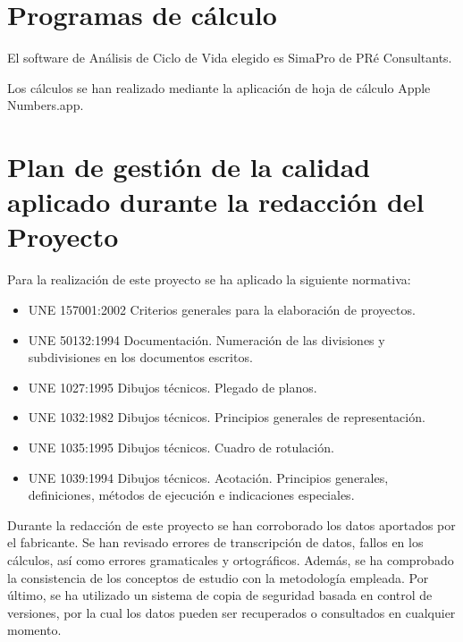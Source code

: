 \section{Programas de cálculo}

El software de Análisis de Ciclo de Vida elegido es SimaPro de PRé Consultants.

Los cálculos se han realizado mediante la aplicación de hoja de cálculo Apple Numbers.app.

\section{Plan de gestión de la calidad aplicado durante la redacción del Proyecto}

Para la realización de este proyecto se ha aplicado la siguiente normativa:
\begin{itemize}
  \item UNE 157001:2002 Criterios generales para la elaboración de proyectos.
  \item UNE 50132:1994 Documentación. Numeración de las divisiones y subdivisiones en los documentos escritos.
  \item UNE 1027:1995 Dibujos técnicos. Plegado de planos.
  \item UNE 1032:1982 Dibujos técnicos. Principios generales de representación.
  \item UNE 1035:1995 Dibujos técnicos. Cuadro de rotulación.
  \item UNE 1039:1994 Dibujos técnicos. Acotación. Principios generales, definiciones, métodos de ejecución e indicaciones especiales.
\end{itemize}

Durante la redacción de este proyecto se han corroborado los datos aportados por el fabricante. Se han revisado errores de transcripción de datos, fallos en los cálculos, así como errores gramaticales y ortográficos. Además, se ha comprobado la consistencia de los conceptos de estudio con la metodología empleada. Por último, se ha utilizado un sistema de copia de seguridad basada en control de versiones, por la cual los datos pueden ser recuperados o consultados en cualquier momento.
